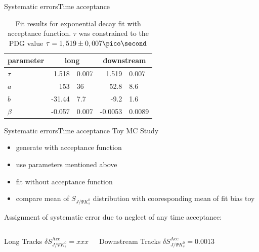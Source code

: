 \documentclass{beamer}
\newcommand{\SJPsi}{S_{J/\Psi K_s^0}}
\begin{document}
\begin{frame}{Systematic errors}{Time acceptance}
\begin{table}
\caption{Fit results for exponential decay fit with acceptance function. $\tau$ was constrained to the PDG value $\tau = 1,519 \pm 0,007 \pico\second$}
\begin{tabular}{lr@{$\pm$}l r@{$\pm$}l}
\hline \hline 
parameter & \multicolumn{2}{c}{long} & \multicolumn{2}{c}{downstream} \\ \hline
$\tau$    & 1.518 & 0.007 & 1.519 & 0.007 \\
$a$       & 153 & 36 & 52.8 & 8.6 \\
$b$       & -31.44 & 7.7 & -9.2 & 1.6 \\
$\beta$   & -0.057 & 0.007 &  -0.0053 & 0.0089 \\ 
\hline \hline
\end{tabular}
\end{table}
\end{frame}

\begin{frame}{Systematic errors}{Time acceptance}
Toy MC Study
\begin{itemize}
\item generate with acceptance function 
\item use parameters mentioned above
\item fit without acceptance function
\item compare mean of $\SJPsi$ distribution with cooresponding mean of fit bias toy
\end{itemize}

Assignment of systematic error due to neglect of any time acceptance:
	\begin{columns}
	\begin{block}{Long Tracks}
    \centering
        $\delta\SJPsi^{\text{Acc}} = xxx$
    \end{block}
	\begin{block}{Downstream Tracks}
    \centering
        $\delta\SJPsi^{\text{Acc}} = 0.0013$
    \end{block}
    \end{columns}


\end{frame}
\end{document}
